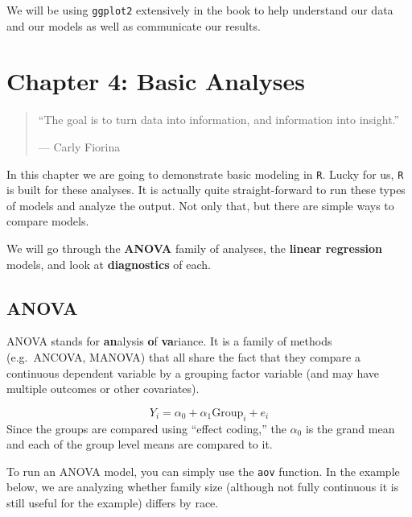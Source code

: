 \documentclass[]{tufte-book}
\newenvironment{Shaded}{}{}
\newcommand{\KeywordTok}[1]{\textcolor[rgb]{0.00,0.44,0.13}{\textbf{#1}}}
\newcommand{\DataTypeTok}[1]{\textcolor[rgb]{0.56,0.13,0.00}{#1}}
\newcommand{\StringTok}[1]{\textcolor[rgb]{0.25,0.44,0.63}{#1}}
\newcommand{\OperatorTok}[1]{\textcolor[rgb]{0.40,0.40,0.40}{#1}}
\newcommand{\NormalTok}[1]{#1}
\theoremstyle{definition}
\theoremstyle{definition}
\theoremstyle{remark}
\begin{document}
We will be using \texttt{ggplot2} extensively in the book to help
understand our data and our models as well as communicate our results.

\chapter*{Chapter 4: Basic Analyses}\label{chapter-4-basic-analyses}

\begin{quote}
``The goal is to turn data into information, and information into
insight.''

--- Carly Fiorina
\end{quote}

In this chapter we are going to demonstrate basic modeling in
\texttt{R}. Lucky for us, \texttt{R} is built for these analyses. It is
actually quite straight-forward to run these types of models and analyze
the output. Not only that, but there are simple ways to compare models.

We will go through the \textbf{ANOVA} family of analyses, the
\textbf{linear regression} models, and look at \textbf{diagnostics} of
each.

\section*{ANOVA}\label{anova}

ANOVA stands for \textbf{an}alysis \textbf{o}f \textbf{va}riance. It is
a family of methods (e.g.~ANCOVA, MANOVA) that all share the fact that
they compare a continuous dependent variable by a grouping factor
variable (and may have multiple outcomes or other covariates).

\[
Y_i = \alpha_0 + \alpha_1 \text{Group}_i + e_i
\] Since the groups are compared using ``effect coding,'' the
\(\alpha_0\) is the grand mean and each of the group level means are
compared to it.

To run an ANOVA model, you can simply use the \texttt{aov} function. In
the example below, we are analyzing whether family size (although not
fully continuous it is still useful for the example) differs by race.

\begin{Shaded}
\end{Shaded}
\end{document}
